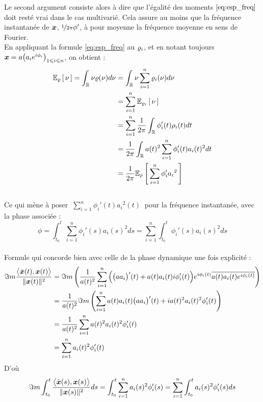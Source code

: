 Le second argument consiste alors à dire que l'égalité des moments $\eqref{eq:esp_freq}$ doit resté vrai dans le cas multivarié. Cela assure au moins que la fréquence instantanée de $\x$, $\nicefrac{1}{2\pi}\phi'$, à pour moyenne la fréquence moyenne en sens de Fourier.
\\

En appliquant la formule \eqref{eq:esp_freq} au $\densis_i$, et en notant toujours $\x = a\big(a_ie^{i\phi_i}\big)_{1\leq i\leq n}$, on obtient :
\begin{align*}
	\esp[\densis]{\nu} = \int_\R \nu\densis(\nu)d\nu &= \int_\R \nu\sum_{i=1}^n \densis_i(\nu) d\nu \\
	&= \sum_{i=1}^n\esp[\densis_i]{\nu} \\
	&= \sum_{i=1}^n\frac{1}{2\pi}\int_\R \phi_i'(t)\densit_i(t)dt \\
	&= \frac{1}{2\pi}\int_\R a(t)^2\sum_{i=1}^n\phi_i'(t)a_i(t)^2 dt 
	\\ &= \frac{1}{2\pi} \esp[\densit]{\sum_{i=1}^n \phi_i'{a_i}^2}
\end{align*}
\\
Ce qui mène à poser $\displaystyle \ \sum_{i=1}^n \phi_i'(t){a_i}^2(t)\ $ pour la fréquence instantanée, avec la phase associée :
\begin{equation}\label{eq:phas_inst_v1}
	\phi = \int_{t_0}^t \sum_{i=1}^n \phi_i'(s){a_i}(s)^2ds 
	= \sum_{i=1}^n \int_{t_0}^t \phi_i'(s){a_i}(s)^2ds 
\end{equation}
\\

Formule qui concorde bien avec celle de la phase dynamique une fois explicité :
\begin{align*}
	\Im m\frac{\big\langle \dot{\x}(t) , \x(t) \big\rangle}{\|\x(t)\|^2} &= \Im m\left( \frac{1}{a(t)^2} \sum_{i=1}^n \Big( \big(aa_i\big)'(t) +a(t)a_i(t)i\phi_i'(t)\Big)e^{i\phi_i(t)}\congu{a(t)a_i(t)e^{i\phi_i(t)}} \right) \\
	&=\frac{1}{a(t)^2}  \Im m\left( \sum_{i=1}^n a(t)a_i(t)\big(aa_i\big)'(t) +ia(t)^2a_i(t)^2\phi_i'(t) \right) \\
	&= \frac{1}{a(t)^2} \sum_{i=1}^n a(t)^2a_i(t)^2 \phi_i'(t) \\
	&= \sum_{i=1}^n a_i(t)^2 \phi_i'(t)
\end{align*}
D'où
\[\Im m\int_{t_0}^t \frac{\big\langle \dot{\x}(s) , \x(s) \big\rangle}{\|\x(s)\|^2} ds = \int_{t_0}^t \sum_{i=1}^n a_i(s)^2 \phi_i'(s) = \sum_{i=1}^n \int_{t_0}^t a_i(s)^2 \phi_i'(s)ds\]
\\



